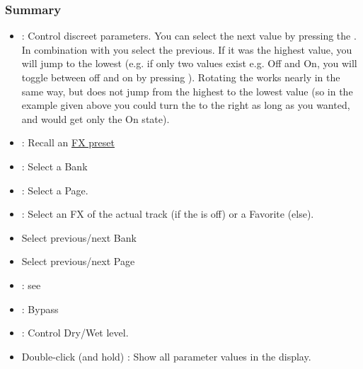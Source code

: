\vspace{-1mm}


\subsubsection{Summary}

\begin{itemize}
\item \vpot: Control discreet parameters. You can select the next
  value by pressing the \vpot. In combination with \shift you select
  the previous. If it was the highest value, you will jump to the
  lowest (e.g. if only two values exist e.g. Off and On, you will
  toggle between off and on by pressing \vpot). Rotating the \vpot
  works nearly in the same way, but does not jump from the highest to
  the lowest value (so in the example given above you could turn the
  \vpot to the right as long as you wanted, and would get only the On
  state).
\item \rec: Recall an \hyperref[fxpresets]{FX preset}
\bemod
\item \solo: Select a Bank
\item \mute: Select a Page. 
\bemod
\item \select: Select an FX of the actual track (if the \gv is off) or a
Favorite (else). 
\bemod
\item \bankdu Select  previous/next Bank
\item \channeldu Select  previous/next Page
\item \gv: see \select
\item \flip: Bypass
\item \mfader: Control Dry/Wet level.
\item Double-click (and hold) \nv: Show all parameter values in the display.
\end{itemize}


